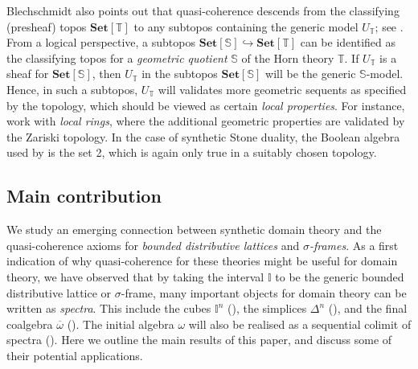 \documentclass[a4paper,12pt]{amsart}
\theoremstyle{definition}
\newcommand{\mb}[1]{\mathbf{#1}}
\newcommand{\mbb}[1]{\mathbb{#1}}
\newcommand{\T}{\mbb T}
\newcommand{\I}{\mbb I}
\newcommand{\Set}{\mb{Set}}
\newcommand{\ov}[1]{\overline{#1}}
\newcommand{\hook}{\hookrightarrow}
\begin{document}
Blechschmidt also points out that quasi-coherence descends from the classifying (presheaf) topos $\Set[\T]$ to any subtopos containing the generic model $U_\T$; see \citet[Cor. 7.7]{blechschmidt2020general}. From a logical perspective, a subtopos $\Set[\mbb S] \hook \Set[\T]$ can be identified as the classifying topos for a \emph{geometric quotient} $\mbb S$ of the Horn theory $\T$. If $U_\T$ is a sheaf for $\Set[\mbb S]$, then $U_\T$ in the subtopos $\Set[\mbb S]$ will be the generic $\mbb S$-model.
Hence, in such a subtopos, $U_\T$ will validates more geometric sequents as specified by the topology, which should be viewed as certain \emph{local properties}. For instance, \citet{blechschmidt2021using,Cherubini_Coquand_Hutzler_2024} work with \emph{local rings}, where the additional geometric properties are validated by the Zariski topology.
In the case of synthetic Stone duality, the Boolean algebra used by \citet{cherubini2024foundation} is the set 2, which is again only true in a suitably chosen topology.


\subsection{Main contribution}\label{sec:contributions}

We study an emerging connection between synthetic domain theory and the quasi-coherence axioms for \emph{bounded distributive lattices} and \emph{$\sigma$-frames}. As a first indication of why quasi-coherence for these theories might be useful for domain theory, we have observed that by taking the interval $\I$ to be the generic bounded distributive lattice or $\sigma$-frame, many important objects for domain theory can be written as \emph{spectra}. This include the cubes $\I^n$ (), the simplices $\Delta^n$ (), and the final coalgebra $\ov\omega$ (). The initial algebra $\omega$ will also be realised as a sequential colimit of spectra (). Here we outline the main results of this paper, and discuss some of their potential applications.
\end{document}
